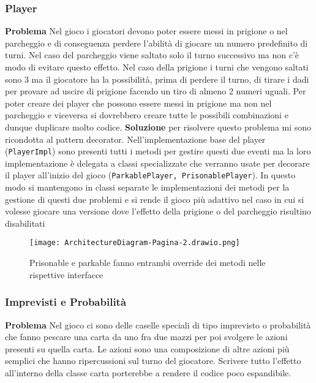 \subsubsection{Player}

\textbf{Problema}\newline
Nel gioco i giocatori devono poter essere messi in prigione o nel parcheggio e di conseguenza perdere l’abilità di giocare un numero predefinito di turni. 
Nel caso del parcheggio viene saltato solo il turno successivo ma non c’è modo di evitare questo effetto.
Nel caso della prigione i turni che vengono saltati sono 3 ma il giocatore ha la possibilità, prima di perdere il turno, di tirare i dadi per provare ad uscire di prigione facendo un tiro di almeno 2 numeri uguali.
Per poter creare dei player che possono essere messi in prigione ma non nel parcheggio e viceversa si dovrebbero creare tutte le possibili combinazioni e dunque duplicare molto codice.
\newline\newline
\textbf{Soluzione}\newline
per risolvere questo problema mi sono ricondotta al pattern decorator. 
Nell'implementazione base del player (\texttt{PlayerImpl}) sono presenti tutti i metodi per gestire questi due eventi ma la loro implementazione è delegata a classi specializzate che verranno usate per decorare il player all’inizio del gioco (\texttt{ParkablePlayer, PrisonablePlayer}). 
In questo modo si mantengono in classi separate le implementazioni dei metodi per la gestione di questi due problemi e si rende il gioco più adattivo nel caso in cui si volesse giocare una versione dove l’effetto della prigione o del parcheggio risultino disabilitati

\begin{figure}[h]
    \centering
    \texttt{[image: ArchitectureDiagram-Pagina-2.drawio.png]}
    \caption{Prisonable e parkable fanno entrambi override dei metodi nelle rispettive interfacce}
    \label{img:ArchitectureDiagram-Pagina-2}
\end{figure}

\subsubsection{Imprevisti e Probabilità}

\textbf{Problema}\newline
Nel gioco ci sono delle caselle speciali di tipo imprevisto o probabilità che fanno pescare una carta da uno fra due mazzi per poi svolgere le azioni presenti su quella carta.
Le azioni sono una composizione di altre azioni più semplici che hanno ripercussioni sul turno del giocatore.
Scrivere tutto l’effetto all’interno della classe carta porterebbe a rendere il codice poco espandibile.

